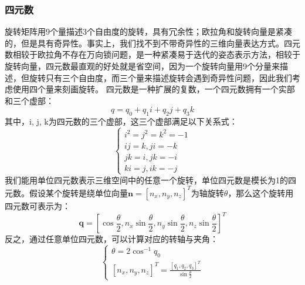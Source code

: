 \subsubsection{四元数}
旋转矩阵用9个量描述3个自由度的旋转，具有冗余性；欧拉角和旋转向量是紧凑的，但是具有奇异性。事实上，我们找不到不带奇异性的三维向量表达方式\cite{rotationgroup}。四元数相较于欧拉角不存在万向锁问题，是一种紧凑易于迭代的姿态表示方法，相较于旋转向量，四元数最直观的好处就是省空间，因为一个旋转向量用9个分量来描述，但旋转只有三个自由度，而三个量来描述旋转会遇到奇异性问题，因此我们考虑使用四个量来刻画旋转。
四元数是一种扩展的复数，一个四元数拥有一个实部和三个虚部：
\begin{equation}
q=q_{0}+q_{1} i+q_{2} j+q_{3} k
\end{equation}
其中，i, j, k为四元数的三个虚部，这三个虚部满足以下关系式：
\begin{equation}
\left\{\begin{array}{c}{i^{2}=j^{2}=k^{2}=-1} \\ {i j=k, j i=-k} \\ {j k=i, j k=-i} \\ {k i=j, i k=-j}\end{array}\right.
\end{equation}
我们能用单位四元数表示三维空间中的任意一个旋转，单位四元数是模长为1的四元数。假设某个旋转是绕单位向量$\boldsymbol{n}=\left[n_{x}, n_{y}, n_{z}\right]^{T}
$为轴旋转$\theta$，那么这个旋转用四元数可表示为：
\begin{equation}
\mathbf{q}=\left[\cos \frac{\theta}{2}, n_{x} \sin \frac{\theta}{2}, n_{y} \sin \frac{\theta}{2}, n_{z} \sin \frac{\theta}{2}\right]^{T}
\end{equation}
反之，通过任意单位四元数，可以计算对应的转轴与夹角：
\begin{equation}
\left\{\begin{array}{c}{\theta=2 \cos ^{-1} q_{0}} \\ {\left[n_{x}, n_{y}, n_{z}\right]^{T}=\frac{\left[q_{1}, q_{2}, q_{3}\right]^{T}}{\sin \frac{\theta}{2}}}\end{array}\right.
\end{equation}
